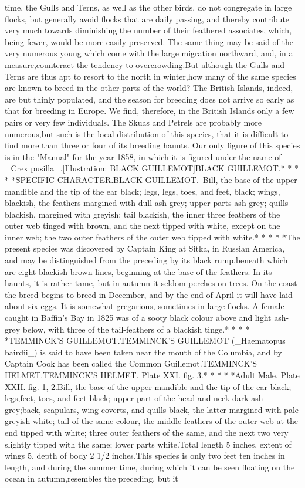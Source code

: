 \documentclass[a4paper]{article}
\begin{document}
time, the Gulls and Terns, as well as the other birds, do not congregate in large flocks, but generally avoid flocks that are daily passing, and thereby contribute very much towards diminishing the number of their feathered associates, which, being fewer, would be more easily preserved. The same thing may be said of the very numerous young which come with the large migration northward, and, in a measure,counteract the tendency to overcrowding.But although the Gulls and Terns are thus apt to resort to the north in winter,how many of the same species are known to breed in the other parts of the world? The British Islands, indeed, are but thinly populated, and the season for breeding does not arrive so early as that for breeding in Europe. We find, therefore, in the British Islands only a few pairs or very few individuals. The Skuas and Petrels are probably more numerous,but such is the local distribution of this species, that it is difficult to find more than three or four of its breeding haunts. Our only figure of this species is in the "Manual" for the year 1858, in which it is figured under the name of _Crex pusilla_.[Illustration: BLACK GUILLEMOT]BLACK GUILLEMOT.*       *       *       *       *SPECIFIC CHARACTER.BLACK GUILLEMOT.--Bill, the base of the upper mandible and the tip of the ear black; legs, legs, toes, and feet, black; wings, blackish, the feathers margined with dull ash-grey; upper parts ash-grey; quills blackish, margined with greyish; tail blackish, the inner three feathers of the outer web tinged with brown, and the next tipped with white, except on the inner web; the two outer feathers of the outer web tipped with white.*       *       *       *       *The present species was discovered by Captain King at Sitka, in Russian America, and may be distinguished from the preceding by its black rump,beneath which are eight blackish-brown lines, beginning at the base of the feathers. In its haunts, it is rather tame, but in autumn it seldom perches on trees. On the coast the breed begins to breed in December, and by the end of April it will have laid about six eggs. It is somewhat gregarious, sometimes in large flocks. A female caught in Baffin's Bay in 1825 was of a sooty black colour above and light ash-grey below, with three of the tail-feathers of a blackish tinge.*       *       *       *       *TEMMINCK'S GUILLEMOT.TEMMINCK'S GUILLEMOT (_Haematopus bairdii_) is said to have been taken near the mouth of the Columbia, and by Captain Cook has been called the Common Guillemot.TEMMINCK'S HELMET.TEMMINCK'S HELMET. Plate XXI. fig. 3.*       *       *       *       *Adult Male. Plate XXII. fig. 1, 2.Bill, the base of the upper mandible and the tip of the ear black; legs,feet, toes, and feet black; upper part of the head and neck dark ash-grey;back, scapulars, wing-coverts, and quills black, the latter margined with pale greyish-white; tail of the same colour, the middle feathers of the outer web at the end tipped with white; three outer feathers of the same, and the next two very slightly tipped with the same; lower parts white.Total length 5 inches, extent of wings 5, depth of body 2 1/2 inches.This species is only two feet ten inches in length, and during the summer time, during which it can be seen floating on the ocean in autumn,resembles the preceding, but it 
\end{document}
